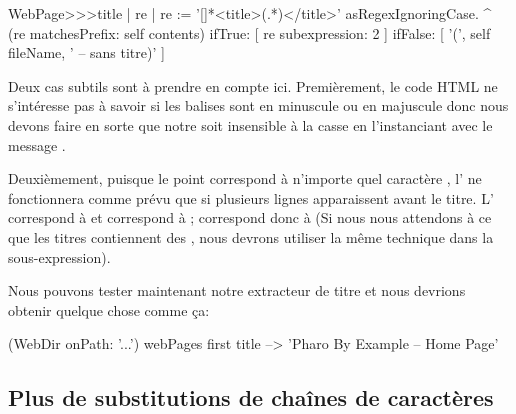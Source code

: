 \documentclass[a4paper,10pt,twoside]{book}
\begin{document}

\begin{code}{}
WebPage>>>title
	| re |
	re := '[\w\W]*<title>(.*)</title>' asRegexIgnoringCase.
	^ (re matchesPrefix: self contents)
		ifTrue: [ re subexpression: 2 ]
		ifFalse: [ '(', self fileName, ' -- sans titre)' ]
\end{code} %

Deux cas subtils sont à prendre en compte ici.
Premièrement, le code HTML ne s'intéresse pas à savoir si les balises
sont en minuscule ou en majuscule donc nous devons faire en sorte que
notre \expreg soit insensible à la casse en l'instanciant avec le
message \mbox{.}

Deuxièmement, puisque le point correspond à n'importe quel caractère , l'\expreg 
\mbox{} ne fonctionnera comme prévu que si
plusieurs lignes apparaissent avant le titre.
L'\expreg \ct{\w} correspond à  
et \ct{\W} correspond à ; \ct{[\w\W]} correspond donc à  (Si nous nous
  attendons à ce que les titres contiennent des
  , nous devrons utiliser la même technique
  dans la sous-expression).

Nous pouvons tester maintenant notre extracteur de titre et nous
devrions obtenir quelque chose comme ça:

\begin{code}{}
(WebDir onPath: '...') webPages first title --> 'Pharo By Example -- Home Page'
\end{code}

\subsection{Plus de substitutions de chaînes de caractères}
\end{document}
